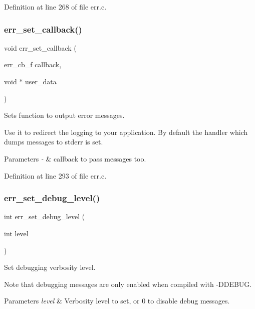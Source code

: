 Definition at line 268 of file err.\+c.

\mbox{\label{err_8c_ab9e9e148e2ab44b15a41a6e11a015c68}} 
\subsubsection{err\+\_\+set\+\_\+callback()}
{\footnotesize\ttfamily void err\+\_\+set\+\_\+callback (\begin{DoxyParamCaption}\item[{err\+\_\+cb\+\_\+f}]{callback,  }\item[{void $\ast$}]{user\+\_\+data }\end{DoxyParamCaption})}



Sets function to output error messages. 

Use it to redirect the logging to your application. By default the handler which dumps messages to stderr is set.


\begin{DoxyParams}{Parameters}
{\em -\/} & callback to pass messages too. \\
\hline
\end{DoxyParams}


Definition at line 293 of file err.\+c.

\mbox{\label{err_8c_ac7956e03cd685da5fe6e134c462f73e1}} 
\subsubsection{err\+\_\+set\+\_\+debug\+\_\+level()}
{\footnotesize\ttfamily int err\+\_\+set\+\_\+debug\+\_\+level (\begin{DoxyParamCaption}\item[{int}]{level }\end{DoxyParamCaption})}



Set debugging verbosity level. 

Note that debugging messages are only enabled when compiled with -\/\+D\+D\+E\+B\+UG.


\begin{DoxyParams}{Parameters}
{\em level} & Verbosity level to set, or 0 to disable debug messages. \\
\hline
\end{DoxyParams}


